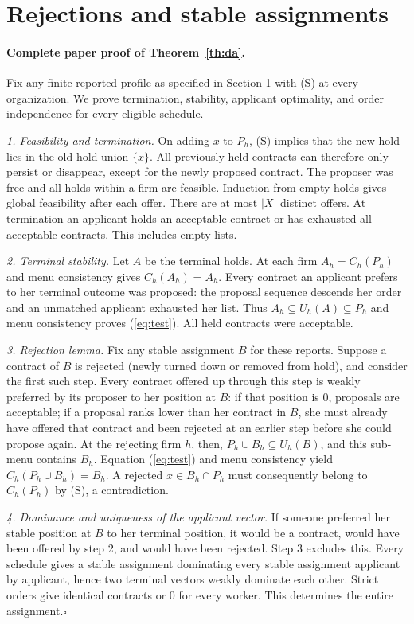 \documentclass[11pt]{article}
\begin{document}
\appendix
\section{Rejections and stable assignments}\label{app:da}
\paragraph{Complete paper proof of Theorem~\ref{th:da}.}
Fix any finite reported profile as specified in Section 1 with (S) at every organization. We prove termination, stability, applicant optimality, and order independence for every eligible schedule.

\textit{1. Feasibility and termination.}
On adding $x$ to $P_h$, (S) implies that the new hold lies in the old hold union $\{x\}$. All previously held contracts can therefore only persist or disappear, except for the newly proposed contract. The proposer was free and all holds within a firm are feasible. Induction from empty holds gives global feasibility after each offer. There are at most $|X|$ distinct offers. At termination an applicant holds an acceptable contract or has exhausted all acceptable contracts. This includes empty lists.

\textit{2. Terminal stability.}
Let $A$ be the terminal holds. At each firm $A_h=C_h(P_h)$ and menu consistency gives $C_h(A_h)=A_h$. Every contract an applicant prefers to her terminal outcome was proposed: the proposal sequence descends her order and an unmatched applicant exhausted her list. Thus $A_h\subseteq U_h(A)\subseteq P_h$ and menu consistency proves (\ref{eq:test}). All held contracts were acceptable.

\textit{3. Rejection lemma.}
Fix any stable assignment $B$ for these reports. Suppose a contract of $B$ is rejected (newly turned down or removed from hold), and consider the first such step. Every contract offered up through this step is weakly preferred by its proposer to her position at $B$: if that position is $0$, proposals are acceptable; if a proposal ranks lower than her contract in $B$, she must already have offered that contract and been rejected at an earlier step before she could propose again. At the rejecting firm $h$, then, $P_h\cup B_h\subseteq U_h(B)$, and this sub-menu contains $B_h$. Equation (\ref{eq:test}) and menu consistency yield $C_h(P_h\cup B_h)=B_h$. A rejected $x\in B_h\cap P_h$ must consequently belong to $C_h(P_h)$ by (S), a contradiction.

\textit{4. Dominance and uniqueness of the applicant vector.}
If someone preferred her stable position at $B$ to her terminal position, it would be a contract, would have been offered by step 2, and would have been rejected. Step 3 excludes this. Every schedule gives a stable assignment dominating every stable assignment applicant by applicant, hence two terminal vectors weakly dominate each other. Strict orders give identical contracts or $0$ for every worker. This determines the entire assignment.\hfill$\square$
\end{document}

